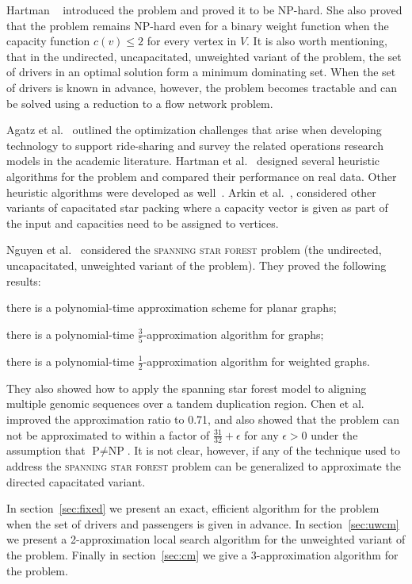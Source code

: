 Hartman ~\cite{hartman2013optimal} introduced the \emph{\CARPOOL{}} problem
and proved it to be NP-hard.
She also proved that the problem remains NP-hard even for a binary weight
function when the capacity function $c(v) \leq 2$ for every vertex in $V$.
It is also worth mentioning, that in the undirected, uncapacitated, unweighted
variant of the problem, the set of drivers in an optimal solution
form a minimum dominating set.
When the set of drivers is known in advance, however, the problem becomes
tractable and can be solved using a reduction to a flow network problem.

Agatz et al.~\cite{agatz2012optimization} outlined the optimization challenges
that arise when developing technology to support ride-sharing and survey the
related operations research models in the academic literature.  
Hartman et al.~\cite{hartman2014theory} designed several heuristic algorithms
for the \CARPOOL{} problem and compared 
their performance on real data.
Other heuristic algorithms were developed as well~\cite{knapen2014exploiting}.
Arkin et al.~\cite{arkin2004approximations}, considered other variants of
capacitated star packing where a capacity vector is given as part of the input and 
capacities need to be assigned to vertices.  

Nguyen et al.~\cite{nguyen2008approximating} considered the \textsc{spanning star forest} problem
(the undirected, uncapacitated, unweighted variant of the problem).
They proved the following results:
\begin{enumerate*}
\item
there is a polynomial-time approximation scheme for planar graphs;
\item 
there is a polynomial-time $\frac{3}{5}$-approximation algorithm for graphs;
\item 
there is a polynomial-time $\frac{1}{2}$-approximation algorithm for weighted graphs.
\end{enumerate*}
They also showed how to apply the spanning star forest model to aligning multiple
genomic sequences over a tandem duplication region.
Chen et al.~\cite{chen2007improved} improved the approximation ratio to 0.71,
and also showed that the problem can not be approximated to within a factor of
$\frac{31}{32} + \epsilon$ for any $\epsilon > 0$ under the assumption 
that $\text{P} \neq \text{NP}$.
It is not clear, however, if any of the technique used to address the
\textsc{spanning star forest} problem can be generalized to approximate the
directed capacitated variant.

In section~\ref{sec:fixed} we present an exact, efficient algorithm for the
problem when the set of drivers and passengers is given in advance.
In section~\ref{sec:uwcm} we present a 2-approximation local search algorithm
for the unweighted variant of the problem.
Finally in section~\ref{sec:cm} we
give a 3-approximation algorithm for the problem.
